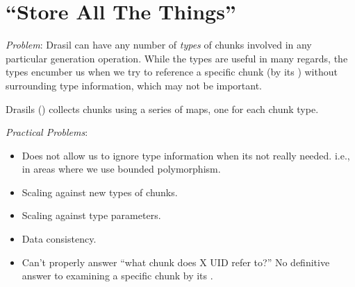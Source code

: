 \chapter{``Store All The Things''}
\label{chap:storingChunks}

\begin{writingdirectives}

      \item \textit{Problem}: Drasil can have any number of \textit{types} of
            chunks involved in any particular generation operation. While the
            types are useful in many regards, the types encumber us when we try
            to reference a specific chunk (by its \UID{}) without surrounding
            type information, which may not be important.

      \item Drasils \ChunkDB{} () collects chunks
            using a series of maps, one for each chunk type.

      \item \textit{Practical Problems}:
            \begin{itemize}

                  \item Does not allow us to ignore type information when its
                        not really needed. i.e., in areas where we use bounded
                        polymorphism.
                  

                  \item Scaling against new types of chunks.
                  
                  \item Scaling against type parameters.
                  
                  \item Data consistency.
                  
                  \item Can't properly answer ``what chunk does X UID refer
                        to?'' No definitive answer to examining a specific chunk
                        by its \UID{}.

            \end{itemize}


\end{writingdirectives}
